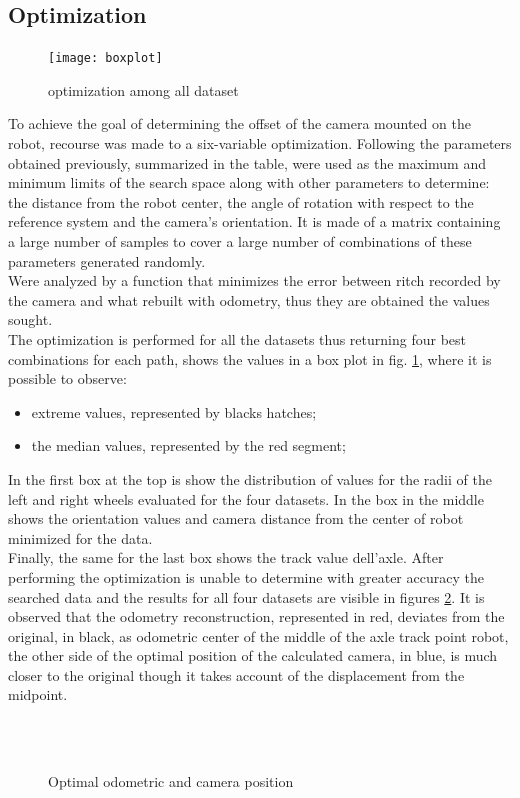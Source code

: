 \subsection{Optimization}
\begin{figure}[htb]
\centering
\texttt{[image: boxplot]}
\caption{optimization among all dataset}
\label{fig:boxplot}
\end{figure}
To achieve the goal of determining the offset of the camera mounted on the robot, recourse was made to a six-variable optimization. Following the parameters obtained previously, summarized in the table, were used as the maximum and minimum limits of the search space along with other parameters to determine: the distance from the robot center, the angle of rotation with respect to the reference system and the camera's orientation.
It is made of a matrix containing a large number of samples to cover a large number of combinations of these parameters generated randomly.
\\Were analyzed by a function that minimizes the error between ritch recorded by the camera and what rebuilt with odometry, thus they are obtained the values sought.\\
The optimization is performed for all the datasets thus returning four best combinations for each path, shows the values in a box plot in fig.  \ref{fig:boxplot}, where it is possible to observe:
\begin{itemize}
\item extreme values, represented by blacks hatches;
\item the median values, represented by the red segment;
\end{itemize}
In the first box at the top is show the distribution of values for the radii of the left and right wheels evaluated for the four datasets.
In the box in the middle shows the orientation values and camera distance from the center of robot minimized for the data. \\
Finally, the same for the last box shows the track value dell'axle.
After performing the optimization is unable to determine with greater accuracy the searched data and the results for all four datasets are visible in figures \ref{fig:OptiOdo}.
It is observed that the odometry reconstruction, represented in red, deviates from the original, in black, as odometric center of the middle of the axle track point robot, the other side of the optimal position of the calculated camera, in blue, is much closer to the original though it takes account of the displacement from the midpoint.
\begin{figure}[!htb]
\centering
{} \,
\\
 \,
\caption{Optimal odometric and camera position}
\label{fig:OptiOdo}
\end{figure}
